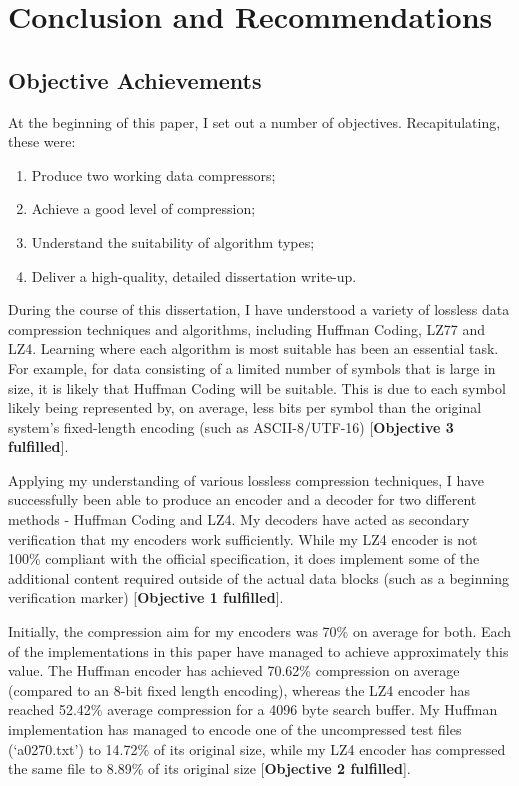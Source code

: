 \documentclass[12pt]{article}
\begin{document}
\section{Conclusion and Recommendations}
\subsection{Objective Achievements}
At the beginning of this paper, I set out a number of objectives. Recapitulating, these were:

\begin{enumerate}
	\item Produce two working data compressors;
	\item Achieve a good level of compression;
	\item Understand the suitability of algorithm types;
	\item Deliver a high-quality, detailed dissertation write-up.
\end{enumerate}

During the course of this dissertation, I have understood a variety of lossless data compression techniques and algorithms, including Huffman Coding, LZ77 and LZ4. Learning where each algorithm is most suitable has been an essential task. For example, for data consisting of a limited number of symbols that is large in size, it is likely that Huffman Coding will be suitable. This is due to each symbol likely being represented by, on average, less bits per symbol than the original system's fixed-length encoding (such as ASCII-8/UTF-16) [\textbf{Objective 3 fulfilled}].

Applying my understanding of various lossless compression techniques, I have successfully been able to produce an encoder and a decoder for two different methods - Huffman Coding and LZ4. My decoders have acted as secondary verification that my encoders work sufficiently. While my LZ4 encoder is not 100\% compliant with the official specification, it does implement some of the additional content required outside of the actual data blocks (such as a beginning verification marker) [\textbf{Objective 1 fulfilled}].

Initially, the compression aim for my encoders was 70\% on average for both. Each of the implementations in this paper have managed to achieve approximately this value. The Huffman encoder has achieved 70.62\% compression on average (compared to an 8-bit fixed length encoding), whereas the LZ4 encoder has reached 52.42\% average compression for a 4096 byte search buffer. My Huffman implementation has managed to encode one of the uncompressed test files (`a0270.txt') to 14.72\% of its original size, while my LZ4 encoder has compressed the same file to 8.89\% of its original size [\textbf{Objective 2 fulfilled}].
\end{document}
